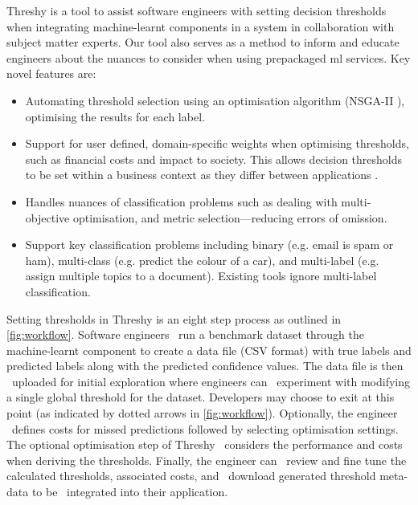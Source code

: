 Threshy is a tool to assist software engineers with setting decision thresholds when integrating machine-learnt components in a system in collaboration with subject matter experts. Our tool also serves as a method to inform and educate engineers about the nuances to consider when using prepackaged \gls{ml} services. Key novel features are:

\begin{itemize}
    \item Automating threshold selection using an optimisation algorithm (NSGA-II \citep{996017}), optimising the results for each label. 
    \item Support for user defined, domain-specific weights when optimising thresholds, such as financial costs and impact to society. This allows decision thresholds to be set within a business context as they differ between applications \citep{Drummond2006}. 
    \item Handles nuances of classification problems such as dealing with multi-objective optimisation, and metric selection---reducing errors of omission.
    \item Support key classification problems including binary (e.g. email is spam or ham), multi-class (e.g. predict the colour of a car), and multi-label (e.g. assign multiple topics to a document). Existing tools ignore multi-label classification.
\end{itemize}

Setting thresholds in Threshy is an eight step process as outlined in \cref{fig:workflow}. Software engineers ~run a benchmark dataset through the machine-learnt component to create a data file (CSV format) with true labels and predicted labels along with the predicted confidence values. The data file is then ~uploaded for initial exploration where engineers can ~experiment with modifying a single global threshold for the dataset. Developers may choose to exit at this point (as indicated by dotted arrows in \cref{fig:workflow}). Optionally, the engineer ~defines costs for missed predictions followed by selecting optimisation settings. The optional optimisation step of Threshy ~considers the performance and costs when deriving the thresholds. Finally, the engineer can ~review and fine tune the calculated thresholds, associated costs, and ~download generated threshold meta-data to be ~integrated into their application.


